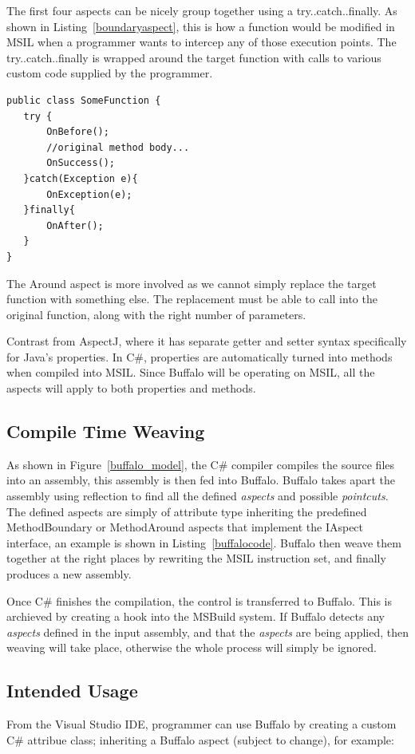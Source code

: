 The first four aspects can be nicely group together using a try..catch..finally. As shown in Listing~\ref{boundaryaspect}, this is how a function would be modified in MSIL when a programmer wants to intercep any of those execution points. The try..catch..finally is wrapped around the target function with calls to various custom code supplied by the programmer. 

\begin{lstlisting}[caption={Buffalo aspects}, label=boundaryaspect]
public class SomeFunction {
   try {
       OnBefore();
       //original method body...
       OnSuccess();
   }catch(Exception e){
       OnException(e);
   }finally{
       OnAfter();
   }
}
\end{lstlisting}

The Around aspect is more involved as we cannot simply replace the target function with something else. The replacement must be able to call into the original function, along with the right number of parameters.

Contrast from AspectJ, where it has separate getter and setter syntax specifically for Java's properties. In C\#, properties are automatically turned into methods when compiled into MSIL. Since Buffalo will be operating on MSIL, all the aspects will apply to both properties and methods.

\subsection{Compile Time Weaving}
As shown in Figure~\ref{buffalo_model}, the C\# compiler compiles the source files into an assembly, this assembly is then fed into Buffalo. Buffalo takes apart the assembly using reflection to find all the defined {\em aspects} and possible {\em pointcuts}. The defined aspects are simply of attribute type inheriting the predefined MethodBoundary or MethodAround aspects that implement the IAspect interface, an example is shown in Listing~\ref{buffalocode}. Buffalo then weave them together at the right places by rewriting the MSIL instruction set, and finally produces a new assembly.

Once C\# finishes the compilation, the control is transferred to Buffalo. This is archieved by creating a hook into the MSBuild system. If Buffalo detects any {\em aspects} defined in the input assembly, and that the {\em aspects} are being applied, then weaving will take place, otherwise the whole process will simply be ignored.

\subsection{Intended Usage}
From the Visual Studio IDE, programmer can use Buffalo by creating a custom C\# attribue class; inheriting a Buffalo aspect (subject to change), for example:

